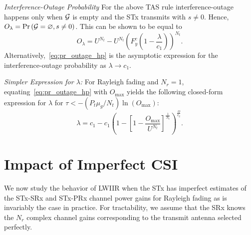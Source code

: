\documentclass[12pt,draftcls,peerreview,onecolumn]{IEEEtran}
\newcommand{\brac}[1]{\left({#1}\right)}
\newcommand{\tendsto}{\to}
\newcommand{\prob}[1]{\text{Pr}\brac{#1}}
\newcommand{\nx}{{0}}
\newcommand{\lam}{\lambda}
\newcommand{\mug}{{\mu_{g}}}
\newcommand{\goodset}{\cal{G}}
\newcommand{\Nt}{{N_t}}
\newcommand{\Nr}{{N_r}}
\newcommand{\Pt}{{P_t}}
\newcommand{\outmax}{O_{\text{max}}}
\newcommand{\itau}{\tau}
\newcommand{\cone}{c_{1}}
\newcommand{\ctwo}{c_{2}}
\newcommand{\out}{O}
\newcommand{\m}{\cone}
\newcommand{\lambym}{\frac{\lam}{\m}}
\newcommand{\al}{\ctwo}
\newcommand{\snr}{\Omega}
\newcommand{\albysnr}[1][]{\frac{\al#1}{\snr}}
\newcommand{\snrbyal}[1][]{\frac{\snr#1}{\al}}
\newcommand{\un}{U}
\newcommand{\outlam}{\out_{\lam}}
\newcommand{\nullset}{\varnothing}
\newcommand{\ccdfyrv}[1]{ F^{c}_{y}\left(#1 \right) }
\begin{document}
{\em Interference-Outage Probability} For the above TAS rule interference-outage happens only when $\goodset$ is empty and the STx  transmits with $s\neq\nx$. Hence,  $\outlam=\prob{{\goodset}=\nullset, s \neq 0}$. This can be shown to be equal to
\begin{equation}
\label{eq:pr_outage_hp}
 \outlam = \un^{\Nt} - \un^{\Nt}\left(\ccdfyrv{1-\lambym} \right)^{\Nt}.
\end{equation}
Alternatively,~\eqref{eq:pr_outage_hp} is the asymptotic expression for the interference-outage probability as $\lam\tendsto\cone$.

{\em Simpler Expression for $\lam$:} For Rayleigh fading and $\Nr=1$, equating~\eqref{eq:pr_outage_hp} with $\outmax$ yields the following closed-form expression for $\lam$ for $\itau<-\left({\Pt\mug}/{\Nt}\right) \ln\left({\outmax}\right)$: 
\begin{equation}
\label{eq:lam_asym}
 \lam  =  \cone - \cone\left(1 - \left[1 - \frac{\outmax}{\un^{\Nt}}\right]^{\frac{1}{\Nt}} \right)^{\snrbyal[]}.
\end{equation}
%




\section{Impact of Imperfect CSI}
\label{sec:imperfectcsi}
We now study the behavior of LWIIR when the STx has imperfect estimates of the STx-SRx and STx-PRx channel power gains for Rayleigh fading as is invariably the case in practice. For tractability, we assume that the SRx knows the $\Nr$  complex channel gains corresponding to the transmit antenna selected perfectly. %
\end{document}
